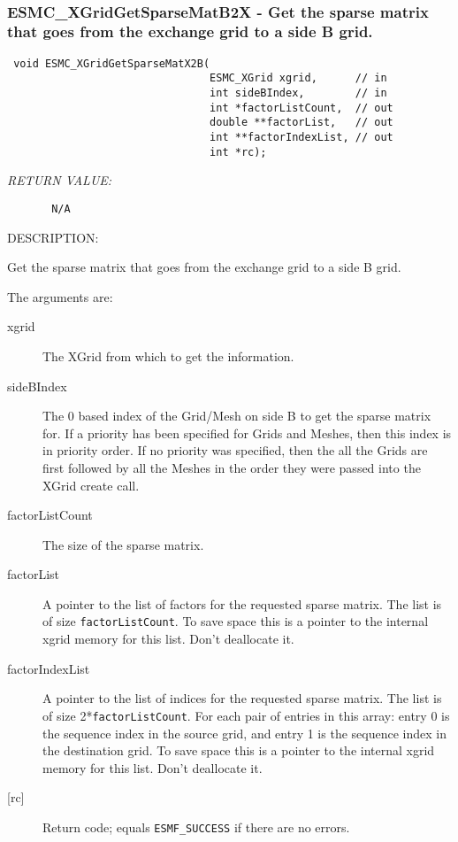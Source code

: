  
\mbox{}\hrulefill\ 
 
\subsubsection [ESMC\_XGridGetSparseMatB2X] {ESMC\_XGridGetSparseMatB2X - Get the sparse matrix that goes from the exchange grid to a side B grid.}


 
  
\begin{verbatim} void ESMC_XGridGetSparseMatX2B(
                                ESMC_XGrid xgrid,      // in
                                int sideBIndex,        // in
                                int *factorListCount,  // out
                                double **factorList,   // out
                                int **factorIndexList, // out
                                int *rc);
 \end{verbatim}{\em RETURN VALUE:}
\begin{verbatim}       N/A\end{verbatim}
{\sf DESCRIPTION:\\ }


   
      Get the sparse matrix that goes from the exchange grid to a side B grid. 
  
    The arguments are:
    \begin{description}
    \item[xgrid]
      The XGrid from which to get the information.
    \item[sideBIndex]
      The 0 based index of the Grid/Mesh on side B to get the sparse matrix for.
      If a priority has been specified for Grids and Meshes, then this index is 
      in priority order. If no priority was specified, then the all the Grids are
      first followed by all the Meshes in the order they were passed into the XGrid 
      create call. 
    \item[factorListCount]
      The size of the sparse matrix.
    \item[factorList]
      A pointer to the list of factors for the requested sparse matrix. 
      The list is of size {\tt factorListCount}. To save space
      this is a pointer to the internal xgrid memory for this list. 
      Don't deallocate it. 
    \item[factorIndexList]
      A pointer to the list of indices for the requested sparse matrix. 
      The list is of size 2*{\tt factorListCount}. For each pair of entries
      in this array: entry 0 is the sequence index in the source grid, and entry 1 is
      the sequence index in the destination grid. To save space 
      this is a pointer to the internal xgrid memory for this list. 
      Don't deallocate it. 
    \item[{[rc]}]
      Return code; equals {\tt ESMF\_SUCCESS} if there are no errors.
    \end{description}
  
\setlength{\parskip}{\oldparskip}
\setlength{\parindent}{\oldparindent}
\setlength{\baselineskip}{\oldbaselineskip}
